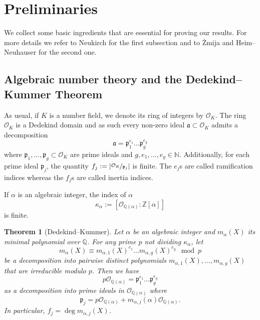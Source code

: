 \documentclass[a4paper, 11pt, reqno]{amsart}
\theoremstyle{plain}
\newtheorem{thm}{Theorem}[section]
\theoremstyle{definition}
\theoremstyle{remark}
\numberwithin{equation}{section}
\newcommand{\Z}{\mathbb{Z}}
\newcommand{\Q}{\mathbb{Q}}
\newcommand{\N}{\mathbb{N}}
\begin{document}
\section{Preliminaries}

We collect some basic ingredients that are essential for proving our results. For more details we refer to Neukirch \cite{Neukirch} for the first subsection and to \.{Z}mija \cite{Zmija} and Heim--Neuhauser \cite{HeimNeu25} for the second one.

\subsection{Algebraic number theory and the Dedekind--Kummer Theorem}

As usual, if $K$ is a number field, we denote its ring of integers by $\mathcal{O}_K$. The ring $\mathcal{O}_K$ is a Dedekind domain and as such every non-zero ideal $\mathfrak{a} \subset \mathcal{O}_K$ admits a decomposition
\begin{equation*}
    \mathfrak{a} = \mathfrak{p}_1^{e_1}\ldots \mathfrak{p}_g^{e_g}
\end{equation*}
where $\mathfrak{p}_1, \ldots, \mathfrak{p}_g \subset \mathcal{O}_K$ are prime ideals and $g, e_1, \ldots, e_g \in \N$. Additionally, for each prime ideal $\mathfrak{p}_j$, the quantity $f_j := \left|\nicefrac{\mathcal{O}_K}{\mathfrak{p}_j}\right|$ is finite. The $e_j$s are called ramification indices whereas the $f_j$s are called inertia indices.

If $\alpha$ is an algebraic integer, the index of $\alpha$
\[\kappa_\alpha := \left[\mathcal{O}_{\Q(\alpha)} : \Z[\alpha]\right]\]
is finite.

\begin{thm}[Dedekind--Kummer]\label{thm:DedekindKummer}
    Let $\alpha$ be an algebraic integer and $m_\alpha(X)$ its minimal polynomial over $\Q$. For any prime $p$ not dividing $\kappa_\alpha$, let
    \[m_\alpha(X) \equiv m_{\alpha,1}(X)^{e_1} \ldots m_{\alpha,g}(X)^{e_g} \mod p\]
    be a decomposition into pairwise distinct polynomials $m_{\alpha,1}(X), \ldots, m_{\alpha,g}(X)$ that are irreducible modulo $p$. Then we have
    \[p\mathcal{O}_{\Q(\alpha)} = \mathfrak{p}_1^{e_1} \ldots \mathfrak{p}_g^{e_g}\]
    as a decomposition into prime ideals in $\mathcal{O}_{\Q(\alpha)}$ where
    \[\mathfrak{p}_j = p\mathcal{O}_{\Q(\alpha)} + m_{\alpha,j}(\alpha)\mathcal{O}_{\Q(\alpha)}.\]
    In particular, $f_j = \deg m_{\alpha,j}(X)$.
\end{thm}
\end{document}
